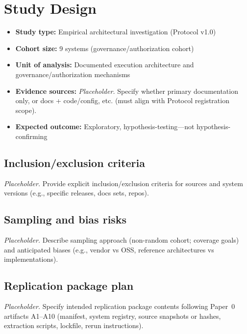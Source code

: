 \section{Study Design}
\label{sec:study-design}
\begin{itemize}
  \item \textbf{Study type:} Empirical architectural investigation (Protocol v1.0)
  \item \textbf{Cohort size:} 9 systems (governance/authorization cohort)
  \item \textbf{Unit of analysis:} Documented execution architecture and governance/authorization mechanisms
  \item \textbf{Evidence sources:} \textit{Placeholder.} Specify whether primary documentation only, or docs + code/config, etc. (must align with Protocol registration scope).
  \item \textbf{Expected outcome:} Exploratory, hypothesis-testing---not hypothesis-confirming
\end{itemize}

\subsection{Inclusion/exclusion criteria}
\textit{Placeholder.} Provide explicit inclusion/exclusion criteria for sources and system versions (e.g., specific releases, docs sets, repos).

\subsection{Sampling and bias risks}
\textit{Placeholder.} Describe sampling approach (non-random cohort; coverage goals) and anticipated biases (e.g., vendor vs OSS, reference architectures vs implementations).

\subsection{Replication package plan}
\textit{Placeholder.} Specify intended replication package contents following Paper~0 artifacts A1--A10 (manifest, system registry, source snapshots or hashes, extraction scripts, lockfile, rerun instructions).

